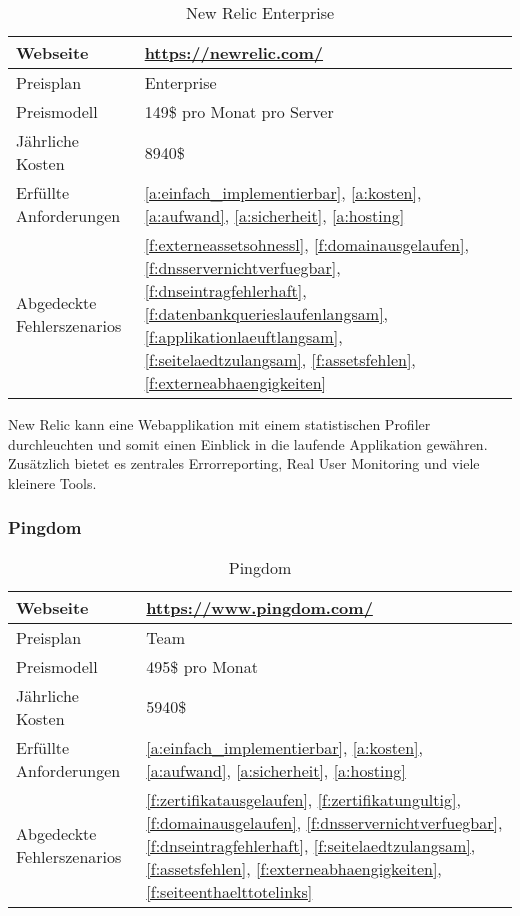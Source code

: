 \begin{table}[H]
  \centering
  \begin{tabular}{p{5cm} p{7cm}}
  \toprule
    Webseite & \url{https://newrelic.com/}\\
  \hline
    Preisplan & Enterprise\\
  \hline
    Preismodell & 149\$ pro Monat pro Server\\
  \hline
    Jährliche Kosten & 8940\$\\
  \hline
    Erfüllte Anforderungen & \ref{a:einfach_implementierbar}, \ref{a:kosten}, \ref{a:aufwand}, \ref{a:sicherheit}, \ref{a:hosting}\\
  \hline
    Abgedeckte Fehlerszenarios & \ref{f:externeassetsohnessl}, \ref{f:domainausgelaufen}, \ref{f:dnsservernichtverfuegbar}, \ref{f:dnseintragfehlerhaft}, \ref{f:datenbankquerieslaufenlangsam}, \ref{f:applikationlaeuftlangsam}, \ref{f:seitelaedtzulangsam}, \ref{f:assetsfehlen}, \ref{f:externeabhaengigkeiten}\\
  \bottomrule
  \end{tabular}
  \caption{New Relic Enterprise}
  \label{tab:new_relic_enterprise}
\end{table}

New Relic kann eine Webapplikation mit einem statistischen Profiler durchleuchten und somit einen Einblick in die laufende Applikation gewähren. Zusätzlich bietet es zentrales Errorreporting, Real User Monitoring und viele kleinere Tools.

\subsubsection{Pingdom}
\label{ssub:pingdom}

\begin{table}[H]
  \centering
  \begin{tabular}{p{5cm} p{7cm}}
  \toprule
    Webseite & \url{https://www.pingdom.com/}\\
  \hline
    Preisplan & Team\\
  \hline
    Preismodell & 495\$ pro Monat\\
  \hline
    Jährliche Kosten & 5940\$\\
  \hline
    Erfüllte Anforderungen & \ref{a:einfach_implementierbar}, \ref{a:kosten}, \ref{a:aufwand}, \ref{a:sicherheit}, \ref{a:hosting}\\
  \hline
    Abgedeckte Fehlerszenarios & \ref{f:zertifikatausgelaufen}, \ref{f:zertifikatungultig}, \ref{f:domainausgelaufen}, \ref{f:dnsservernichtverfuegbar}, \ref{f:dnseintragfehlerhaft}, \ref{f:seitelaedtzulangsam}, \ref{f:assetsfehlen}, \ref{f:externeabhaengigkeiten}, \ref{f:seiteenthaelttotelinks}\\
  \bottomrule
  \end{tabular}
  \caption{Pingdom}
  \label{tab:pingdom}
\end{table}


